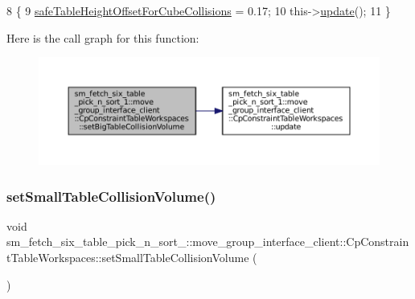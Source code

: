 \begin{DoxyCode}
8         \{
9             \hyperlink{classsm__fetch__six__table__pick__n__sort__1_1_1move__group__interface__client_1_1CpConstraintTableWorkspaces_a3fb4f4deb8a694ff797af6336e74444e}{safeTableHeightOffsetForCubeCollisions} = 0.17;
10             this->\hyperlink{classsm__fetch__six__table__pick__n__sort__1_1_1move__group__interface__client_1_1CpConstraintTableWorkspaces_a2588601a0f45af921e1864f8ba765c51}{update}();
11         \}
\end{DoxyCode}
Here is the call graph for this function\+:
\nopagebreak
\begin{figure}[H]
\begin{center}
\leavevmode
\includegraphics[width=350pt]{classsm__fetch__six__table__pick__n__sort__1_1_1move__group__interface__client_1_1CpConstraintTableWorkspaces_a135da93bbac81518b8551f39221ce47f_cgraph}
\end{center}
\end{figure}
\mbox{\label{classsm__fetch__six__table__pick__n__sort__1_1_1move__group__interface__client_1_1CpConstraintTableWorkspaces_a65cb88bd556ced33b106e8f5dd4ce2f3}} 
\subsubsection{\texorpdfstring{set\+Small\+Table\+Collision\+Volume()}{setSmallTableCollisionVolume()}}
{\footnotesize\ttfamily void sm\+\_\+fetch\+\_\+six\+\_\+table\+\_\+pick\+\_\+n\+\_\+sort\+\_\+::move\+\_\+group\+\_\+interface\+\_\+client\+::\+Cp\+Constraint\+Table\+Workspaces\+::set\+Small\+Table\+Collision\+Volume (\begin{DoxyParamCaption}{ }\end{DoxyParamCaption})}



